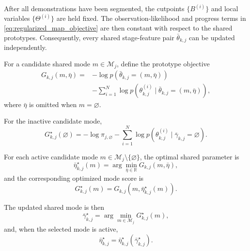 \documentclass[lettersize,journal]{IEEEtran}
\begin{document}
After all demonstrations have been segmented, the cutpoints
$\{B^{(i)}\}$ and local variables $\{\Theta^{(i)}\}$ are held fixed.
The observation-likelihood and progress terms in
\eqref{eq:regularized_map_objective} are then constant with respect to the
shared prototypes. Consequently, every shared stage-feature pair
$\bar{\theta}_{k,j}$ can be updated independently.

For a candidate shared mode
$m\in\mathcal{M}_j$, define the prototype objective
\begin{equation}
\begin{aligned}
G_{k,j}(m,\bar{\eta})
=
&
-
\log
p
\left(
\bar{\theta}_{k,j}
=
(m,\bar{\eta})
\right)
\\
&
-
\sum_{i=1}^{N}
\log
p
\left(
\theta_{k,j}^{(i)}
\mid
\bar{\theta}_{k,j}
=
(m,\bar{\eta})
\right),
\end{aligned}
\label{eq:shared_candidate_mode_objective}
\end{equation}
where $\bar{\eta}$ is omitted when $m=\varnothing$.

For the inactive candidate mode,
\begin{equation}
G_{k,j}^{\star}(\varnothing)
=
-
\log \pi_{j,\varnothing}
-
\sum_{i=1}^{N}
\log
p
\left(
\theta_{k,j}^{(i)}
\mid
\bar{\gamma}_{k,j}=\varnothing
\right).
\label{eq:shared_inactive_score}
\end{equation}

For each active candidate mode
$m\in\mathcal{M}_j\setminus\{\varnothing\}$, the optimal shared parameter is
\begin{equation}
\bar{\eta}_{k,j}^{\star}(m)
=
\arg\min_{\bar{\eta}\in\mathbb{R}}
G_{k,j}(m,\bar{\eta}),
\label{eq:shared_parameter_map_update}
\end{equation}
and the corresponding optimized mode score is
\begin{equation}
G_{k,j}^{\star}(m)
=
G_{k,j}
\left(
m,
\bar{\eta}_{k,j}^{\star}(m)
\right).
\label{eq:optimized_shared_mode_score}
\end{equation}

The updated shared mode is then
\begin{equation}
\bar{\gamma}_{k,j}^{\star}
=
\arg\min_{m\in\mathcal{M}_j}
G_{k,j}^{\star}(m),
\label{eq:shared_mode_map_update}
\end{equation}
and, when the selected mode is active,
\begin{equation}
\bar{\eta}_{k,j}^{\star}
=
\bar{\eta}_{k,j}^{\star}
\left(
\bar{\gamma}_{k,j}^{\star}
\right).
\label{eq:shared_parameter_selected_update}
\end{equation}
\end{document}
